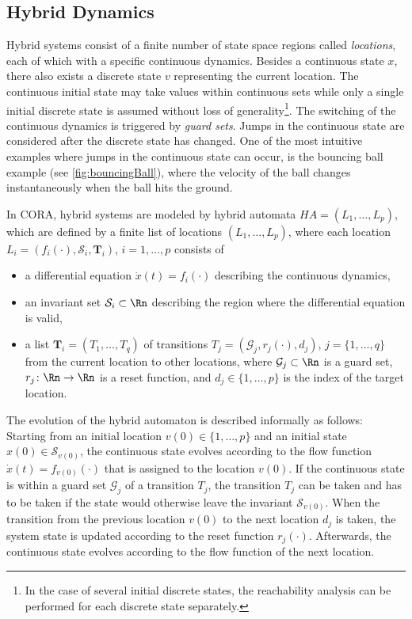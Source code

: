 
\subsection{Hybrid Dynamics} \label{sec:hybridDynamics}

Hybrid systems consist of a finite number of state space regions called \textit{locations}, each of which with a specific continuous dynamics. Besides a continuous state $x$, there also exists a discrete state $v$ representing the current location. The continuous initial state may take values within continuous sets while only a single initial discrete state is assumed without loss of generality\footnote{In the case of several initial discrete states, the reachability analysis can be performed for each discrete state separately.}. The switching of the continuous dynamics is triggered by \textit{guard sets}. Jumps in the continuous state are considered after the discrete state has changed. One of the most intuitive examples where jumps in the continuous state can occur, is the bouncing ball example (see \cref{fig:bouncingBall}), where the velocity of the ball changes instantaneously when the ball hits the ground.

\vspace{0.2cm}

In CORA, hybrid systems are modeled by hybrid automata $HA = (L_1,\dots,L_p)$, which are defined by a finite list of locations $(L_1,\dots,L_p)$, where each location $L_i = (f_i(\cdot),\mathcal{S}_i,\mathbf{T}_i)$, $i = 1,\dots,p$ consists of
\begin{itemize}
    \item a differential equation $\dot{x}(t) = f_i(\cdot)$ describing the continuous dynamics,
    \item an invariant set $\mathcal{S}_i \subset \Rn$ describing the region where the differential equation is valid,
    \item a list $\mathbf{T}_i = ( T_1,\dots, T_q)$ of transitions $T_j = ( \mathcal{G}_j,r_j(\cdot),d_j )$, $j = \{1,\dots,q\}$ from the current location to other locations, where $\mathcal{G}_j \subset \Rn$ is a guard set, $r_j\colon \Rn \to \Rn$ is a reset function, and $d_j \in \{1,\dots,p\}$ is the index of the target location.
\end{itemize}

\vspace{0.2cm}

The evolution of the hybrid automaton is described informally as follows: Starting from an initial location $v(0) \in \{1,\dots,p\}$ and an initial state $x(0)\in \mathcal{S}_{v(0)}$, the continuous state evolves according to the flow function $\dot{x}(t) = f_{v(0)}(\cdot)$ that is assigned to the location $v(0)$. If the continuous state is within a guard set $\mathcal{G}_j$ of a transition $T_j$, the transition $T_j$ can be taken and has to be taken if the state would otherwise leave the invariant $\mathcal{S}_{v(0)}$. When the transition from the previous location $v(0)$ to the next location $d_j$ is taken, the system state is updated according to the reset function $r_j(\cdot)$. Afterwards, the continuous state evolves according to the flow function of the next location.

